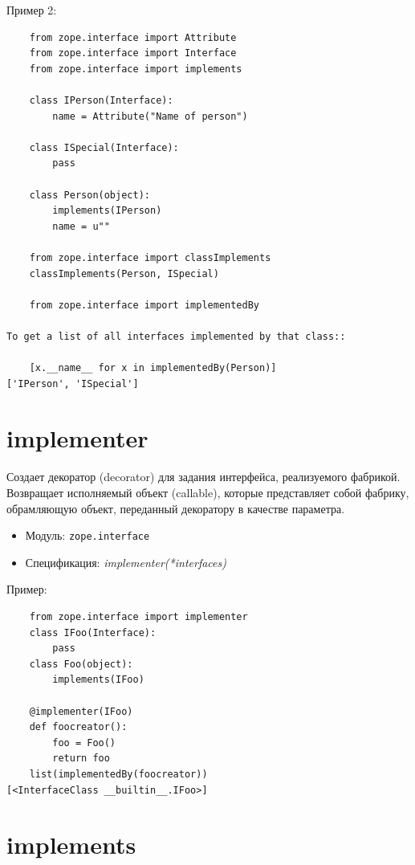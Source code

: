 \documentclass[a4paper,openany,twoside,final]{book}
\providecommand*{\DUroletitlereference}[1]{\textsl{#1}}
\begin{document}
Пример 2:

\begin{verbatim}
    from zope.interface import Attribute
    from zope.interface import Interface
    from zope.interface import implements

    class IPerson(Interface):
        name = Attribute("Name of person")

    class ISpecial(Interface):
        pass

    class Person(object):
        implements(IPerson)
        name = u""

    from zope.interface import classImplements
    classImplements(Person, ISpecial)

    from zope.interface import implementedBy

To get a list of all interfaces implemented by that class::

    [x.__name__ for x in implementedBy(Person)]
['IPerson', 'ISpecial']
\end{verbatim}


\section*{implementer%
  \label{implementer}%
}

Создает декоратор (decorator) для задания интерфейса, реализуемого фабрикой.  Возвращает исполняемый объект (callable), которые представляет собой фабрику, обрамляющую объект, переданный декоратору в качестве параметра.

\begin{itemize}

\item Модуль: \texttt{zope.interface}

\item Спецификация: \DUroletitlereference{implementer(*interfaces)}

\end{itemize}

Пример:

\begin{verbatim}
    from zope.interface import implementer
    class IFoo(Interface):
        pass
    class Foo(object):
        implements(IFoo)

    @implementer(IFoo)
    def foocreator():
        foo = Foo()
        return foo
    list(implementedBy(foocreator))
[<InterfaceClass __builtin__.IFoo>]
\end{verbatim}


\section*{implements%
  \label{implements}%
}
\end{document}
